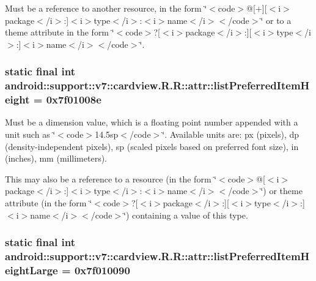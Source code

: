Must be a reference to another resource, in the form \char`\"{}$<$code$>$@\mbox{[}+\mbox{]}\mbox{[}$<$i$>$package$<$/i$>$:\mbox{]}$<$i$>$type$<$/i$>$:$<$i$>$name$<$/i$>$$<$/code$>$\char`\"{} or to a theme attribute in the form \char`\"{}$<$code$>$?\mbox{[}$<$i$>$package$<$/i$>$:\mbox{]}\mbox{[}$<$i$>$type$<$/i$>$:\mbox{]}$<$i$>$name$<$/i$>$$<$/code$>$\char`\"{}. \hypertarget{classandroid_1_1support_1_1v7_1_1cardview_1_1_r_1_1attr_494fd87c00e4d8ef07d1a8fe8f7461d3}{
\subsubsection[{listPreferredItemHeight}]{\setlength{\rightskip}{0pt plus 5cm}static final int android::support::v7::cardview.R.R::attr::listPreferredItemHeight = 0x7f01008e}}
\label{classandroid_1_1support_1_1v7_1_1cardview_1_1_r_1_1attr_494fd87c00e4d8ef07d1a8fe8f7461d3}


Must be a dimension value, which is a floating point number appended with a unit such as \char`\"{}$<$code$>$14.5sp$<$/code$>$\char`\"{}. Available units are: px (pixels), dp (density-independent pixels), sp (scaled pixels based on preferred font size), in (inches), mm (millimeters). 

This may also be a reference to a resource (in the form \char`\"{}$<$code$>$@\mbox{[}$<$i$>$package$<$/i$>$:\mbox{]}$<$i$>$type$<$/i$>$:$<$i$>$name$<$/i$>$$<$/code$>$\char`\"{}) or theme attribute (in the form \char`\"{}$<$code$>$?\mbox{[}$<$i$>$package$<$/i$>$:\mbox{]}\mbox{[}$<$i$>$type$<$/i$>$:\mbox{]}$<$i$>$name$<$/i$>$$<$/code$>$\char`\"{}) containing a value of this type. \hypertarget{classandroid_1_1support_1_1v7_1_1cardview_1_1_r_1_1attr_b41fc8697f4850be1af15080cc3206d8}{
\subsubsection[{listPreferredItemHeightLarge}]{\setlength{\rightskip}{0pt plus 5cm}static final int android::support::v7::cardview.R.R::attr::listPreferredItemHeightLarge = 0x7f010090}}
\label{classandroid_1_1support_1_1v7_1_1cardview_1_1_r_1_1attr_b41fc8697f4850be1af15080cc3206d8}


